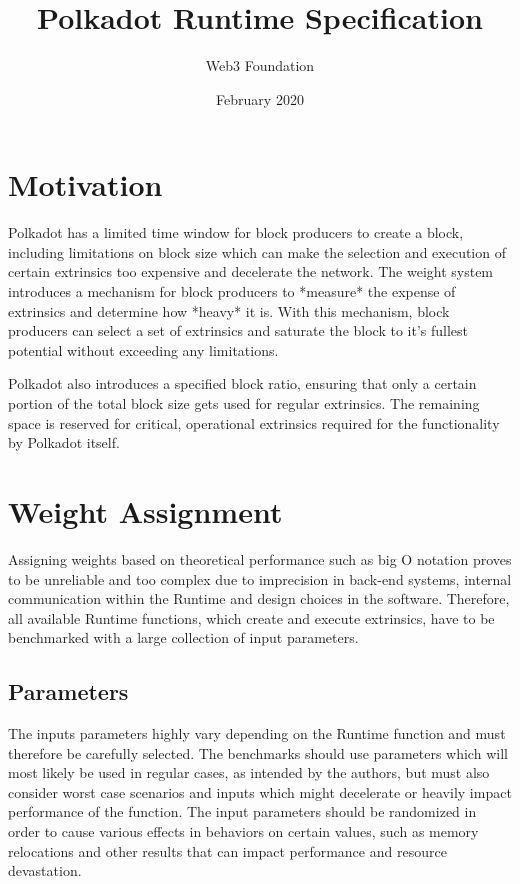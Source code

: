 \documentclass[11pt,a4paper]{article}
\begin{document}
\title{Polkadot Runtime Specification}
\author{Web3 Foundation}
\date{February 2020}
\maketitle

\section{Motivation}
Polkadot has a limited time window for block producers to create a block,
including limitations on block size which can make the selection and execution
of certain extrinsics too expensive and decelerate the network. The weight
system introduces a mechanism for block producers to *measure* the expense of
extrinsics and determine how *heavy* it is. With this mechanism, block producers
can select a set of extrinsics and saturate the block to it's fullest potential
without exceeding any limitations.
\newline

Polkadot also introduces a specified block ratio, ensuring that only a certain
portion of the total block size gets used for regular extrinsics. The remaining
space is reserved for critical, operational extrinsics required for the functionality 
by Polkadot itself.

\section{Weight Assignment}
Assigning weights based on theoretical performance such as big O notation proves to be
unreliable and too complex due to imprecision in back-end systems, internal communication
within the Runtime and design choices in the software. Therefore, all available Runtime 
functions, which create and execute extrinsics, have to be benchmarked with a large
collection of input parameters.

\subsection{Parameters}
The inputs parameters highly vary depending on the Runtime function and must therefore
be carefully selected. The benchmarks should use parameters which will most likely be
used in regular cases, as intended by the authors, but must also consider worst case
scenarios and inputs which might decelerate or heavily impact performance of the function.
The input parameters should be randomized in order to cause various effects in behaviors
on certain values, such as memory relocations and other results that can impact performance
and resource devastation.
\end{document}
